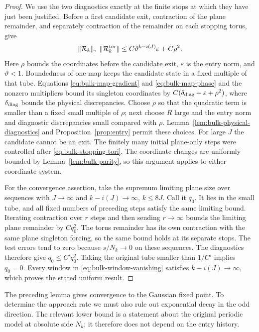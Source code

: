\begin{proof}
We use the two diagnostics exactly at the finite stops at which
they have just been justified.  Before a first candidate exit,
contraction of the plane remainder, and separately contraction of
the remainder on each stopping torus, give
\[
 \lVert\mathcal R_k\rVert,\ \lVert\mathcal R_k^{\rm tor}\rVert
 \le C\vartheta^{k-i(J)}\varepsilon+C\rho^2.
\]
Here $\rho$ bounds the coordinates before the candidate exit,
$\varepsilon$ is the entry norm, and $\vartheta<1$.  Boundedness
of one map keeps the candidate state in a fixed multiple of that
tube.  Equations \eqref{eq:bulk-map-gradient} and
\eqref{eq:bulk-map-phase} and the nonzero multipliers bound its
singleton coordinates by
$C(\delta_{\rm diag}+\varepsilon+\rho^2)$, where
$\delta_{\rm diag}$ bounds the physical discrepancies.
Choose $\rho$ so that the quadratic term is smaller than a
fixed small multiple of $\rho$; next choose $R$ large and the
entry norm and diagnostic discrepancies small compared with
$\rho$.  Lemma~\ref{lem:bulk-physical-diagnostics} and
Proposition~\ref{prop:entry} permit these choices.  For large
$J$ the candidate cannot be an exit.  The finitely many initial
plane-only steps were controlled after
\eqref{eq:bulk-stopping-tori}.  The coordinate changes are
uniformly bounded by Lemma~\ref{lem:bulk-parity}, so this argument
applies to either coordinate system.

For the convergence assertion, take the supremum limiting plane
size over sequences with $J\to\infty$ and
$k-i(J)\to\infty$, $k\le8J$.  Call it $q_0$.  It lies in the
small tube, and all fixed numbers of preceding steps satisfy
the same limiting bound.  Iterating contraction over $r$ steps
and then sending $r\to\infty$ bounds the limiting plane
remainder by $Cq_0^2$.  The torus remainder has its own
contraction with the same plane singleton forcing, so the
same bound holds at its separate stops.  The test errors tend
to zero because $s/N_k\to0$ on these sequences.  The diagnostics
therefore give $q_0\le C'q_0^2$.  Taking the original tube
smaller than $1/C'$ implies $q_0=0$.  Every window in
\eqref{eq:bulk-window-vanishing} satisfies
$k-i(J)\to\infty$, which proves the stated uniform result.
\end{proof}

The preceding lemma gives convergence to the Gaussian fixed point.
To determine the approach rate we must also rule out exponential
decay in the odd direction.  The relevant lower bound is a
statement about the original periodic model at absolute side
$N_k$; it therefore does not depend on the entry history.

